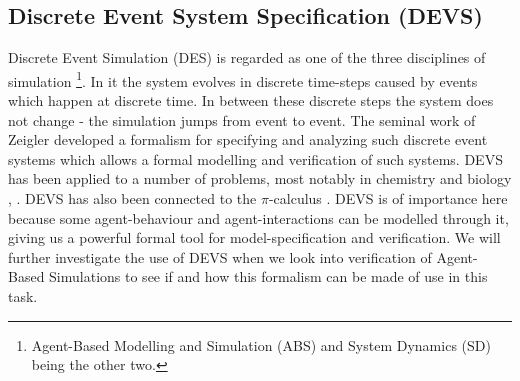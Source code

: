 \subsection{Discrete Event System Specification (DEVS)}
Discrete Event Simulation (DES) is regarded as one of the three disciplines of simulation \footnote{Agent-Based Modelling and Simulation (ABS) and System Dynamics (SD) being the other two.}. In it the system evolves in discrete time-steps caused by events which happen at discrete time. In between these discrete steps the system does not change - the simulation jumps from event to event. The seminal work of Zeigler \cite{zeigler_theory_2000} developed a formalism for specifying and analyzing such discrete event systems which allows a formal modelling and verification of such systems. DEVS has been applied to a number of problems, most notably in chemistry and biology \cite{ewald_discrete_2007}, \cite{uhrmacher_discrete_2005}. DEVS has also been connected to the $\pi$-calculus \cite{wang_pi-calculus_2008}.
DEVS is of importance here because some agent-behaviour and agent-interactions can be modelled through it, giving us a powerful formal tool for model-specification and verification. We will further investigate the use of DEVS when we look into verification of Agent-Based Simulations to see if and how this formalism can be made of use in this task.